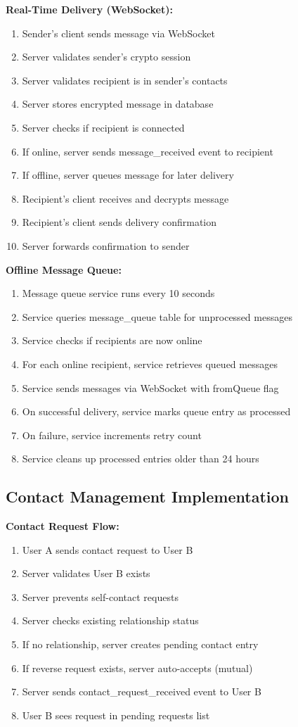 \textbf{Real-Time Delivery (WebSocket):}
\begin{enumerate}
    \item Sender's client sends message via WebSocket
    \item Server validates sender's crypto session
    \item Server validates recipient is in sender's contacts
    \item Server stores encrypted message in database
    \item Server checks if recipient is connected
    \item If online, server sends message\_received event to recipient
    \item If offline, server queues message for later delivery
    \item Recipient's client receives and decrypts message
    \item Recipient's client sends delivery confirmation
    \item Server forwards confirmation to sender
\end{enumerate}

\textbf{Offline Message Queue:}
\begin{enumerate}
    \item Message queue service runs every 10 seconds
    \item Service queries message\_queue table for unprocessed messages
    \item Service checks if recipients are now online
    \item For each online recipient, service retrieves queued messages
    \item Service sends messages via WebSocket with fromQueue flag
    \item On successful delivery, service marks queue entry as processed
    \item On failure, service increments retry count
    \item Service cleans up processed entries older than 24 hours
\end{enumerate}

\subsection{Contact Management Implementation}

\textbf{Contact Request Flow:}
\begin{enumerate}
    \item User A sends contact request to User B
    \item Server validates User B exists
    \item Server prevents self-contact requests
    \item Server checks existing relationship status
    \item If no relationship, server creates pending contact entry
    \item If reverse request exists, server auto-accepts (mutual)
    \item Server sends contact\_request\_received event to User B
    \item User B sees request in pending requests list
\end{enumerate}

